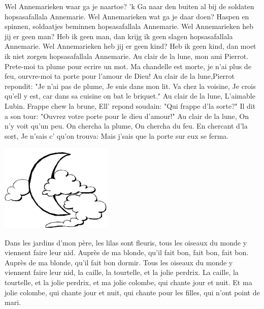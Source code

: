\documentclass{article}
\begin{document}
\begin{songs}{}
\endsong
{}
\beginverse*
Wel Annemarieken waar ga je naartoe? 
'k Ga naar den buiten al bij de soldaten hopsasafallala Annemarie. 
\endverse
\beginverse*
Wel Annemarieken wat ga je daar doen? 
Haspen en spinnen, soldaatjes beminnen hopsasafallala Annemarie. 
\endverse
\beginverse*
Wel Annemarieken heb jij er geen man? 
Heb ik geen man, dan krijg ik geen slagen hopsasafallala Annemarie. 
\endverse
\beginverse*
Wel Annemarieken heb jij er geen kind? 
Heb ik geen kind, dan moet ik niet zorgen hopsasafallala Annemarie. 
\endverse
\endsong
{}
\beginverse*
Au clair de la lune, mon ami Pierrot. Prete-moi ta plume pour ecrire un mot. Ma chandelle est morte, je n'ai plus de feu, ourvre-moi ta porte pour l'amour de Dieu!
\endverse
\beginverse*
Au clair de la lune,Pierrot repondit: "Je n'ai pas de plume, Je suis dans mon lit. Va chez la voisine, Je crois qu'ell y est, car dans sa cuisine on bat le briquet."
\endverse
\beginverse*
Au clair de la lune, L'aimable Lubin. Frappe chew la brune, Ell' repond soudain: "Qui frappe d'la sorte?" Il dit a son tour: "Ouvrez votre porte pour le dieu d'amour!"
\endverse
\beginverse*
Au clair de la lune, On n'y voit qu'un peu. On chercha la plume, On chercha du feu. En chercant d'la sort, Je n'sais c' qu'on trouva: Mais j'sais que la porte  sur eux se ferma.
\endverse
\endsong
\begin{intersong}
    \includegraphics[width=0.4\textwidth]{img5}
\end{intersong}
\beginverse
Dans les jardins d'mon père, les lilas sont fleuris, tous les oiseaux du monde y viennent faire leur nid.
\endverse
\beginchorus
Auprès de ma blonde, qu'il fait bon, fait bon, fait bon.
Auprès de ma blonde, qu'il fait bon dormir.
\endchorus
\beginverse
Tous les oiseaux du monde y viennent faire leur nid, la caille, la tourtelle, et la jolie perdrix.
\endverse
\beginverse
La caille, la tourtelle, et la jolie perdrix, et ma jolie colombe, qui chante jour et nuit.
\endverse
\beginverse
Et ma jolie colombe, qui chante jour et nuit, qui chante pour les filles, qui n’ont point de mari.

\end{songs}
\end{document}
